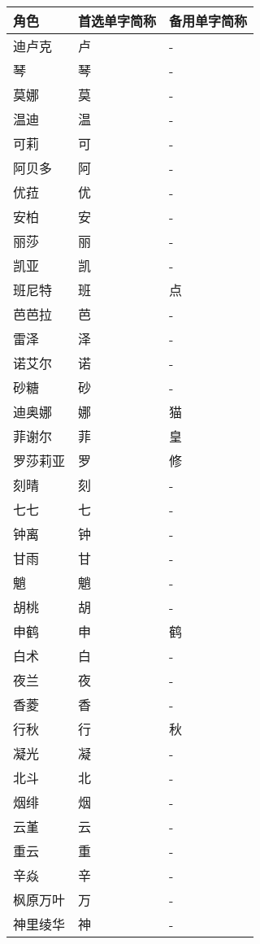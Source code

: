 \begin{longtabu}{|X[2c]|X[c]|X[c]|}
	\hline
	{角色} & {首选单字简称} & {备用单字简称} \\
	\hline
	\endhead
	\hline
	\endfoot
	{迪卢克} & {卢} & {-} \\
	{琴} & {琴} & {-} \\
	{莫娜} & {莫} & {-} \\
	{温迪} & {温} & {-} \\
	{可莉} & {可} & {-} \\
	{阿贝多} & {阿} & {-} \\
	{优菈} & {优} & {-} \\
	\hline
	{安柏} & {安} & {-} \\
	{丽莎} & {丽} & {-} \\
	{凯亚} & {凯} & {-} \\
	{班尼特} & {班} & {点} \\
	{芭芭拉} & {芭} & {-} \\
	{雷泽} & {泽} & {-} \\
	{诺艾尔} & {诺} & {-} \\
	{砂糖} & {砂} & {-} \\
	{迪奥娜} & {娜} & {猫} \\
	{菲谢尔} & {菲} & {皇} \\
	{罗莎莉亚} & {罗} & {修} \\
	\hline
	{刻晴} & {刻} & {-} \\
	{七七} & {七} & {-} \\
	{钟离} & {钟} & {-} \\
	{甘雨} & {甘} & {-} \\
	{魈} & {魈} & {-} \\
	{胡桃} & {胡} & {-} \\
	{申鹤} & {申} & {鹤} \\
	{白术} & {白} & {-} \\
	{夜兰} & {夜} & {-} \\
	{香菱} & {香} & {-} \\
	{行秋} & {行} & {秋} \\
	{凝光} & {凝} & {-} \\
	{北斗} & {北} & {-} \\
	{烟绯} & {烟} & {-} \\
	{云堇} & {云} & {-} \\
	{重云} & {重} & {-} \\
	{辛焱} & {辛} & {-} \\
	\hline
	{枫原万叶} & {万} & {-} \\
	{神里绫华} & {神} & {-} \\

\end{longtabu}
